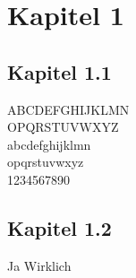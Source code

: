 



\section{Kapitel 1}

\subsection{Kapitel 1.1}

ABCDEFGHIJKLMN\\OPQRSTUVWXYZ\\
abcdefghijklmn\\opqrstuvwxyz\\
1234567890

\subsection{Kapitel 1.2}
Ja Wirklich


